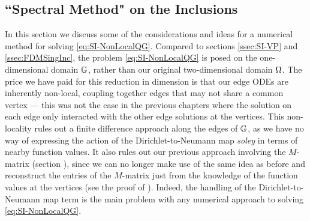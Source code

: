 \subsection{``Spectral Method" on the Inclusions} \label{ssec:SI-GraphMethod}

In this section we discuss some of the considerations and ideas for a numerical method for solving \eqref{eq:SI-NonLocalQG}.
Compared to sections \ref{ssec:SI-VP} and \ref{ssec:FDMSingInc}, the problem \eqref{eq:SI-NonLocalQG} is posed on the one-dimensional domain $\mathbb{G}$, rather than our original two-dimensional domain $\Omega$.
The price we have paid for this reduction in dimension is that our edge ODEs are inherently non-local, coupling together edges that may not share a common vertex --- this was not the case in the previous chapters  where the solution on each edge only interacted with the other edge solutions at the vertices.
This non-locality rules out a finite difference approach along the edges of $\mathbb{G}$, as we have no way of expressing the action of the Dirichlet-to-Neumann map \emph{soley} in terms of nearby function values.
It also rules out our previous approach involving the $M$-matrix (section ), since we can no longer make use of the same idea as before and reconstruct the entries of the $M$-matrix just from the knowledge of the function values at the vertices (see the proof of ).
Indeed, the handling of the Dirichlet-to-Neumann map term is the main problem with any numerical approach to solving \eqref{eq:SI-NonLocalQG}.

